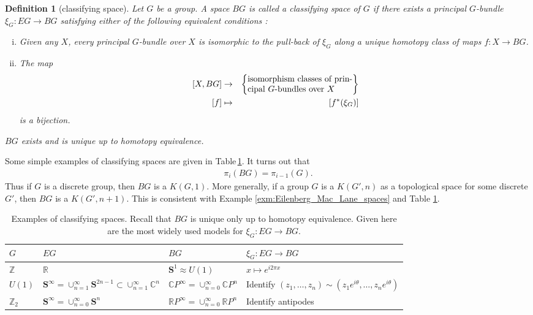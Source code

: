 \documentclass[sort&compress]{elsarticle}
\theoremstyle{theoremstyle}
\theoremstyle{framedtheoremstyle}
\theoremstyle{definitionstyle}
\newtheorem{dfn}[nul]{Definition}%
\theoremstyle{definitionstyle}
\theoremstyle{definitionstyle}
\theoremstyle{definitionstyle}
\theoremstyle{nameddefinitionstyle}
\theoremstyle{framednameddefinitionstyle}
\theoremstyle{proofstyle}
\theoremstyle{definitionstyle}
\newcommand{\fromto}{\rightarrow}
\newcommand{\ZZZ}{\mathbb{Z}}
\newcommand{\RRR}{\mathbb{R}}
\newcommand{\CCC}{\mathbb{C}}
\renewcommand{\SS}{\mathbf{S}}
\newcommand{\homeomorphic}{\approx}
\newcommand{\paren}[1]{\left( #1 \right)}
\newcommand{\brackets}[1]{\left[ #1 \right]}
\newcommand{\braces}[1]{\left\{ #1 \right\}}
\begin{document}
\begin{appendices}
\begin{dfn}[classifying space]
Let $G$ be a group. A space $BG$ is called a classifying space of $G$ if there exists a principal $G$-bundle $\xi_G: EG \fromto BG$ satisfying either of the following equivalent conditions \cite{AdemMilgram}:
\begin{enumerate}[(i)]
\item Given any $X$, every principal $G$-bundle over $X$ is isomorphic to the pull-back of $\xi_G$ along a unique homotopy class of maps $f: X \fromto BG$.

\item The map
\begin{eqnarray}
\brackets{X, BG} &\fromto& \braces{\parbox{1.7in}{isomorphism classes of principal $G$-bundles over $X$}} \nonumber\\
\brackets{f} &\mapsto& \brackets{f^\ast(\xi_G)}
\end{eqnarray}
is a bijection.
\end{enumerate}
$BG$ exists and is unique up to homotopy equivalence.
\end{dfn}


Some simple examples of classifying spaces are given in Table\,\ref{table:classifying_spaces}. 
It turns out \cite{Hatcher, AdemMilgram} that
\begin{eqnarray}
\pi_i\paren{BG} = \pi_{i-1}(G).
\end{eqnarray}
Thus if $G$ is a discrete group, then $BG$ is a $K(G,1)$. More generally, if a group $G$ is a $K(G',n)$ as a topological space for some discrete $G'$, then $BG$ is a $K(G', n+1)$. This is consistent with Example \ref{exm:Eilenberg_Mac_Lane_spaces} and Table \ref{table:classifying_spaces}.

\begin{table}[t]
\caption{Examples of classifying spaces. Recall that $BG$ is unique only up to homotopy equivalence. Given here are the most widely used models for $\xi_G: EG \fromto BG$.}
\begin{tabular}{llll}
\hline
\hline
$G$ & $EG$ & $BG$ & $\xi_G: EG \fromto BG$ \\
\hline
$\ZZZ$ & $\RRR$ & $\SS^1 \homeomorphic U(1)$ & $x \mapsto e^{i 2\pi x}$ \\
$U(1)$ & $\SS^\infty = \cup_{n=1}^\infty \SS^{2n-1} \subset \cup_{n=1}^\infty \CCC^{n}$ & $\CCC P^\infty = \cup_{n=0}^\infty \CCC P^n$ & Identify $\paren{z_1, \ldots, z_n} \sim \paren{z_1 e^{i\theta}, \ldots, z_n e^{i\theta}}$ \\
$\ZZZ_2$ & $\SS^\infty = \cup_{n=0}^\infty \SS^n$ & $\RRR P^\infty = \cup_{n=0}^\infty \RRR P^n$ & Identify antipodes \\
\hline
\hline
\end{tabular}
\label{table:classifying_spaces}
\end{table}


\end{appendices}
\end{document}
